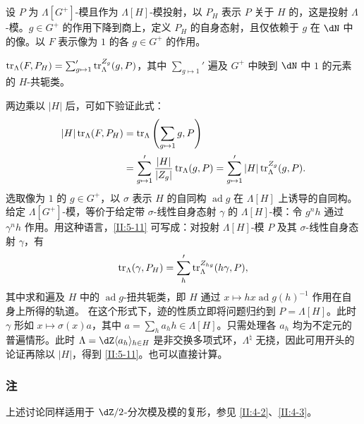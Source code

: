 \subsection{}\label{II:5-10}
设 $P$ 为 $\Lambda[G^+]$-模且作为 $\Lambda[H]$-模投射，以 $P_H$ 表示 $P$ 关于 $H$ 的，这是投射 $\Lambda$-模。$g\in G^+$ 的作用下降到商上，定义 $P_H$ 的自身态射，且仅依赖于 $g$ 在 $\dN$ 中的像。以 $F$ 表示像为 $1$ 的各 $g\in G^+$ 的作用。
\begin{proposition_}\label{II:5-11}
$\operatorname{tr}_\Lambda(F,P_H)=\sum_{g\mapsto1}'\operatorname{tr}_\Lambda^{Z_g}(g,P)$，其中 $\sum_{g\mapsto1}'$ 遍及 $G^+$ 中映到 $\dN$ 中 $1$ 的元素的 $H$-共轭类。
\end{proposition_}
两边乘以 $|H|$ 后，可如下验证此式：
\begin{align*}
|H|\operatorname{tr}_\Lambda(F,P_H)&=\operatorname{tr}_\Lambda\left(\sum_{g\mapsto1}g,P\right)\\
&=\sum_{g\mapsto1}'\frac{|H|}{|Z_g|}\operatorname{tr}_\Lambda(g,P)
=\sum_{g\mapsto1}'|H|\operatorname{tr}_\Lambda^{Z_g}(g,P).
\end{align*}
选取像为 $1$ 的 $g\in G^+$，以 $\sigma$ 表示 $H$ 的自同构 $\operatorname{ad}g$ 在 $\Lambda[H]$ 上诱导的自同构。给定 $\Lambda[G^+]$-模，等价于给定带 $\sigma$-线性自身态射 $\gamma$ 的 $\Lambda[H]$-模：令 $g^nh$ 通过 $\gamma^nh$ 作用。用这种语言，\ref{II:5-11} 可写成：对投射 $\Lambda[H]$-模 $P$ 及其 $\sigma$-线性自身态射 $\gamma$，有
\[\operatorname{tr}_\Lambda(\gamma,P_H)=\sum_h'\operatorname{tr}_\Lambda^{Z_{hg}}(h\gamma,P),\]
其中求和遍及 $H$ 中的 $\operatorname{ad}g$-扭共轭类，即 $H$ 通过 $x\mapsto h x\operatorname{ad}g(h)^{-1}$ 作用在自身上所得的轨道。
在这个形式下，迹的性质立即将问题归约到 $P=\Lambda[H]$。此时 $\gamma$ 形如 $x\mapsto\sigma(x)a$，其中 $a=\sum_ha_hh\in\Lambda[H]$。只需处理各 $a_h$ 均为不定元的普遍情形。此时 $\Lambda=\dZ\langle a_h\rangle_{h\in H}$ 是非交换多项式环，$\Lambda^\natural$ 无挠，因此可用开头的论证再除以 $|H|$，得到 \ref{II:5-11}。也可以直接计算。

\subsubsection{注}\label{II:5-11-1}
上述讨论同样适用于 $\dZ/2$-分次模及模的复形，参见 \ref{II:4-2}、\ref{II:4-3}。

